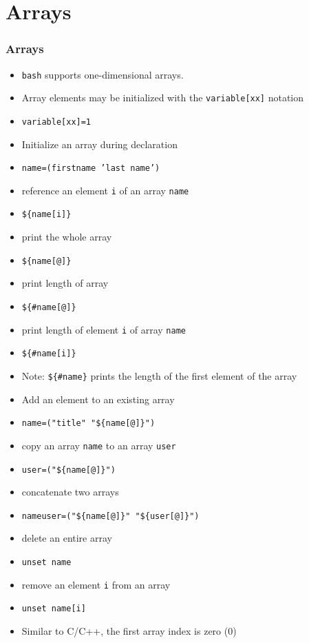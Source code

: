 \documentclass[slidestop,mathserif,compress,xcolor=svgnames]{beamer}
\begin{document}
\section{Arrays}
\begin{frame}
  \frametitle{\small Arrays}
  \begin{itemize}
    \item \texttt{bash} supports one-dimensional arrays.
    \item Array elements may be initialized with the \texttt{variable[xx]} notation
    \item[] \texttt{variable[xx]=1}
    \item Initialize an array during declaration
    \item[] \texttt{name=(firstname 'last name')}
    \item reference an element \texttt{i} of an array \texttt{name}
    \item[] \texttt{\$\{name[i]\}}
    \item print the whole array
    \item[] \texttt{\$\{name[@]\}}
    \item print length of array
    \item[] \texttt{\$\{\#name[@]\}}
    \item print length of element \texttt{i} of array \texttt{name}
    \item[] \texttt{\$\{\#name[i]\}}
    \item[] Note: \texttt{\$\{\#name\}} prints the length of the first element of the array
    \item Add an element to an existing array
    \item[] \texttt{name=("title" "\$\{name[@]\}")}
    \item copy an array \texttt{name} to an array \texttt{user}
    \item[] \texttt{user=("\$\{name[@]\}")}
    \item concatenate two arrays
    \item[] \texttt{nameuser=("\$\{name[@]\}" "\$\{user[@]\}")}
    \item delete an entire array
    \item[] \texttt{unset name}
    \item remove an element \texttt{i} from an array
    \item[] \texttt{unset name[i]}
    \item Similar to C/C++, the first array index is zero (0)
  \end{itemize}

\end{frame}
\end{document}
